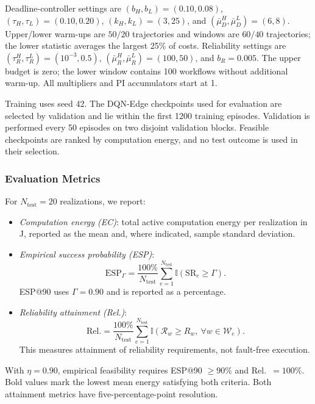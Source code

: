 \documentclass[journal]{IEEEtran}
\newcommand{\ind}{\mathbb{I}}
\begin{document}
Deadline-controller settings are $(b_H,b_L)=(0.10,0.08)$, $(\tau_H,\tau_L)=(0.10,0.20)$, $(k_H,k_L)=(3,25)$, and $(\bar\mu_D^H,\bar\mu_D^L)=(6,8)$. Upper/lower warm-ups are $50/20$ trajectories and windows are $60/40$ trajectories; the lower statistic averages the largest 25\% of costs. Reliability settings are $(\tau_R^H,\tau_R^L)=(10^{-3},0.5)$, $(\bar\mu_R^H,\bar\mu_R^L)=(100,50)$, and $b_R=0.005$. The upper budget is zero; the lower window contains 100 workflows without additional warm-up. All multipliers and PI accumulators start at 1.

Training uses seed 42. The DQN-Edge checkpoints used for evaluation are selected by validation and lie within the first 1200 training episodes. Validation is performed every 50 episodes on two disjoint validation blocks. Feasible checkpoints are ranked by computation energy, and no test outcome is used in their selection.

\subsubsection{Evaluation Metrics}

For $N_{\mathrm{test}}=20$ realizations, we report:

\begin{itemize}
\item \emph{Computation energy (EC)}: total active computation energy per realization in J, reported as the mean and, where indicated, sample standard deviation.

\item \emph{Empirical success probability (ESP)}:
    \[
        \mathrm{ESP}_{\Gamma}
        =\frac{100\%}{N_{\mathrm{test}}}
        \sum_{e=1}^{N_{\mathrm{test}}}
        \ind(\mathrm{SR}_e\geq\Gamma).
    \]
ESP@90 uses $\Gamma=0.90$ and is reported as a percentage.

\item \emph{Reliability attainment (Rel.)}:
    \[
        \mathrm{Rel.}
        =\frac{100\%}{N_{\mathrm{test}}}
        \sum_{e=1}^{N_{\mathrm{test}}}
        \ind\!\left(
            \mathcal R_w\geq R_w,\ 
            \forall w\in\mathcal W_e
        \right).
    \]
This measures attainment of reliability requirements, not fault-free execution.
\end{itemize}

With $\eta=0.90$, empirical feasibility requires ESP@90 $\geq90\%$ and Rel.\ $=100\%$. Bold values mark the lowest mean energy satisfying both criteria. Both attainment metrics have five-percentage-point resolution.
\end{document}
